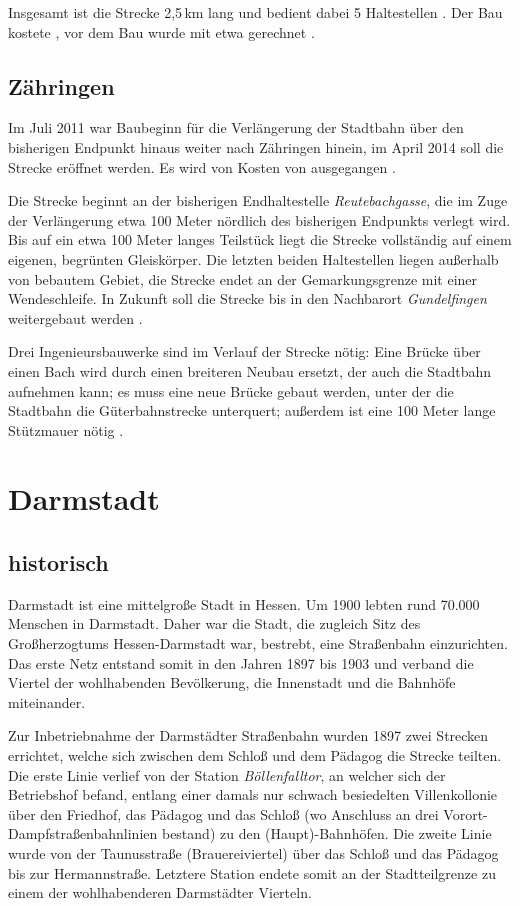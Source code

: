 Insgesamt ist die Strecke 2,5\,km lang und bedient dabei 5 Haltestellen \cite{FRabv}.
Der Bau kostete  \cite{FRabv2}, vor dem Bau wurde mit etwa  gerechnet \cite{FRbku}.


\subsection*{Zähringen}

Im Juli 2011 war Baubeginn für die Verlängerung der Stadtbahn über den bisherigen Endpunkt hinaus weiter nach Zähringen hinein, im April 2014 soll die Strecke eröffnet werden. Es wird von Kosten von  ausgegangen \cite{FRabz}.

Die Strecke beginnt an der bisherigen Endhaltestelle \textit{Reutebachgasse}, die im Zuge der Verlängerung etwa 100 Meter nördlich des bisherigen Endpunkts verlegt wird. Bis auf ein etwa 100 Meter langes Teilstück liegt die Strecke vollständig auf einem eigenen, begrünten Gleiskörper. Die letzten beiden Haltestellen liegen außerhalb von bebautem Gebiet, die Strecke endet an der Gemarkungsgrenze mit einer Wendeschleife. In Zukunft soll die Strecke bis in den Nachbarort \textit{Gundelfingen} weitergebaut werden \cite{FRabz}.

Drei Ingenieursbauwerke sind im Verlauf der Strecke nötig: Eine Brücke über einen Bach wird durch einen breiteren Neubau ersetzt, der auch die Stadtbahn aufnehmen kann; es muss eine neue Brücke gebaut werden, unter der die Stadtbahn die Güterbahnstrecke unterquert; außerdem ist eine 100 Meter lange Stützmauer nötig \cite{FRabz}.


\section{Darmstadt}

\subsection*{historisch}

Darmstadt ist eine mittelgroße Stadt in Hessen. Um 1900 lebten rund 70.000
Menschen in Darmstadt. Daher war die Stadt, die zugleich Sitz des Großherzogtums
Hessen-Darmstadt war, bestrebt, eine Straßenbahn einzurichten. Das erste Netz
entstand somit in den Jahren 1897 bis 1903 und verband die Viertel der
wohlhabenden Bevölkerung, die Innenstadt und die Bahnhöfe miteinander. \cite{buernheim1997bahnen}

Zur Inbetriebnahme der Darmstädter Straßenbahn wurden 1897 zwei Strecken
errichtet, welche sich zwischen dem Schloß und dem Pädagog die Strecke
teilten. Die erste Linie verlief von der Station \emph{Böllenfalltor}, an
welcher sich der Betriebshof befand, entlang einer damals nur schwach
besiedelten Villenkollonie über den Friedhof, das Pädagog und das Schloß (wo
Anschluss an drei Vorort-Dampfstraßenbahnlinien bestand) zu den
(Haupt)-Bahnhöfen. Die zweite Linie wurde von der Taunusstraße (Brauereiviertel)
über das Schloß und das Pädagog bis zur Hermannstraße. Letztere Station endete
somit an der Stadtteilgrenze zu einem der wohlhabenderen Darmstädter Vierteln. \cite{hoeltge1992hessen}

